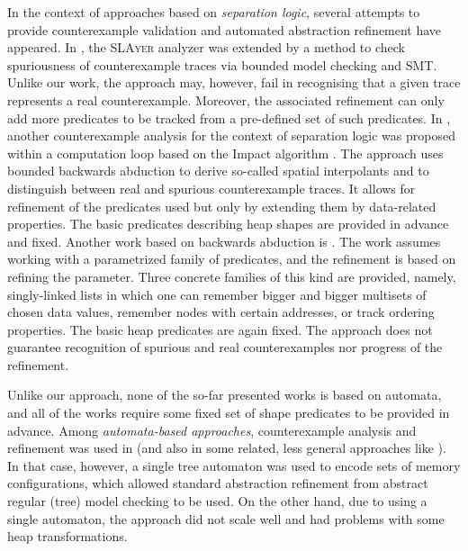{%

In the context of approaches based on \emph{separation logic}, several attempts
to provide counterexample validation and automated abstraction refinement have
appeared. In \cite{slayer12}, the \textsc{SLAyer} analyzer was extended by a method to
check spuriousness of counterexample traces via bounded model checking and SMT.
Unlike our work, the approach may, however, fail in recognising that a given
trace represents a real counterexample. Moreover, the associated refinement can
only add more predicates to be tracked from a pre-defined set of such
predicates. In \cite{splinter15}, another counterexample analysis for the
context of separation logic was proposed within a computation loop based on the
Impact algorithm \cite{impact06}. The approach uses bounded backwards abduction
to derive so-called spatial interpolants and to distinguish between real and
spurious counterexample traces. It allows for refinement of the predicates used
but only by extending them by data-related properties. The basic predicates
describing heap shapes are provided in advance and fixed. Another work based on
backwards abduction is \cite{botincan15}. The work assumes working with a
parametrized family of predicates, and the refinement is based on refining the
parameter. Three concrete families of this kind are provided, namely,
singly-linked lists in which one can remember bigger and bigger multisets of
chosen data values, remember nodes with certain addresses, or track ordering
properties. The basic heap predicates are again fixed. The approach does not
guarantee recognition of spurious and real counterexamples nor progress of the
refinement.

Unlike our approach, none of the so-far presented works is based on automata,
and all of the works require some fixed set of shape predicates to be provided
in advance. Among \emph{automata-based approaches}, counterexample analysis and
refinement was used in \cite{bhrv06b} (and also in some related, less general
approaches like \cite{bhmv05}). In that case, however, a single tree automaton
was used to encode sets of memory configurations, which allowed standard
abstraction refinement from abstract regular (tree) model checking
\cite{artmc} to be used. On the other hand, due to using a single automaton,
the approach did not scale well and had problems with some heap transformations.


}
